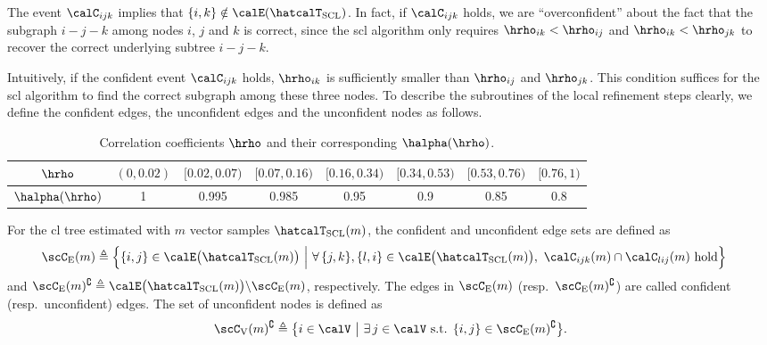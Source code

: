 \documentclass[11pt,onecolumn]{article}
\begin{document}
\begin{remark}
	The event $\calC_{ijk}$ implies that $\{i,k\}\notin\calE(\hatcalT_{\rm{SCL}})$. In fact, if $\calC_{ijk}$ holds, we are ``overconfident'' about the fact  that the subgraph $i-j-k$ among nodes $i$, $j$ and $k$ is correct, since the \ac{scl} algorithm only requires $\hrho_{ik}< \hrho_{ij}$ and $\hrho_{ik}< \hrho_{jk}$ to recover the correct underlying subtree $i-j-k$.
\end{remark}
Intuitively, if the confident event $\calC_{ijk}$ holds, $\hrho_{ik}$ is sufficiently smaller than $\hrho_{ij}$ and $\hrho_{jk}$. This condition suffices  for the \ac{scl} algorithm to find the correct subgraph among these three nodes. To describe the subroutines of the local refinement steps clearly, we define the confident edges, the unconfident edges and the unconfident nodes as follows.
\begin{table}[H]
	\normalsize
	\centering
	\begin{tabular}{|c|c|c|c|c|c|c|c|}
	\hline
	$\hrho$ & $(0,0.02)$ & $[0.02,0.07)$ & $[0.07,0.16)$ & $[0.16,0.34)$ & $[0.34,0.53)$ & $[0.53,0.76)$ & $[0.76,1)$\\
	\hline
	$\halpha(\hrho)$ & 1 & 0.995 & 0.985 & 0.95 & 0.9 & 0.85 & 0.8 \\
	\hline
	\end{tabular}
	\caption{Correlation coefficients $\hrho$ and their corresponding $\halpha(\hrho)$.}
	\label{table:alpha}
\end{table}
\begin{definition}\label{def:confide}
	For the \ac{cl} tree estimated with $m$ vector samples $\hatcalT_{\rm{SCL}}(m)$, the confident and unconfident edge sets are defined as
	\begin{align}
		\scC_{\mathrm{E}}(m)&\triangleq \Big\{\{i,j\}\in\calE\big(\hatcalT_{\rm{SCL}}(m)\big) ~\Big|~\forall\, \{j,k\},\{l,i\}\in\calE\big(\hatcalT_{\rm{SCL}}(m)\big),~\calC_{ijk}(m) \cap\calC_{lij}(m) \text{ hold}\Big\}
		\end{align}
		and $\scC_{\mathrm{E}}(m)^{\complement} \triangleq \calE\big(\hatcalT_{\rm{SCL}}(m)\big)\backslash \scC_{\mathrm{E}}(m)$,
	respectively. The edges in $\scC_{\mathrm{E}}(m)$ (resp.\ $\scC_{\mathrm{E}}(m)^{\complement}$) are called confident (resp.\ unconfident) edges. The set of unconfident nodes  is defined as
	\begin{align}
		\scC_{\mathrm{V}}(m)^{\complement}\triangleq \big\{i\in\calV \ \big| \ \exists\,  j\in\calV \text{ s.t. }\{i,j\}\in \scC_{\mathrm{E}}(m)^{\complement} \big\}.\nonumber
	\end{align}
\end{definition}
\end{document}
